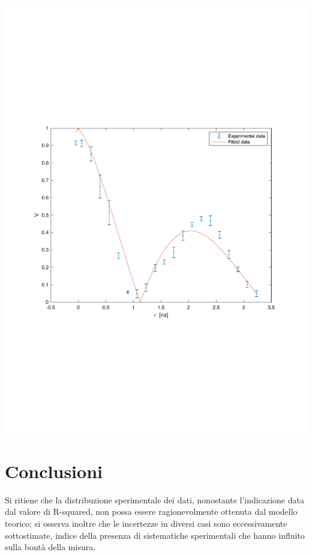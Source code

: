 \documentclass[10pt,oneside,a4paper]{article}
\newenvironment{Figure}
  {\par\medskip\noindent\minipage{\linewidth}}
  {\endminipage\par\medskip}
\begin{document}
\begin{multicols}{2}
\begin{Figure}
	\begin{center}
	\includegraphics[width=\linewidth]{FIT.pdf}
	\label{fig:fit}
	\end{center}
\end{Figure}

\section{Conclusioni}
Si ritiene che la distribuzione sperimentale dei dati, nonostante l'indicazione data dal valore di R-squared, non possa essere ragionevolmente ottenuta dal modello teorico; si osserva inoltre che le incertezze in diversi casi sono eccessivamente sottostimate, indice della presenza di sistematiche sperimentali che hanno influito sulla bontà della misura. 


\end{multicols}
\end{document}
